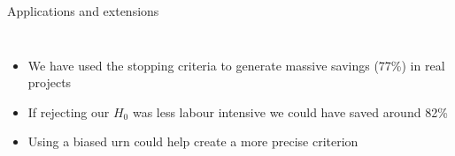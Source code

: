 \documentclass[9pt,aspectratio=169]{beamer}
\begin{document}
\begin{frame}{Applications and extensions}
\begin{columns}

\small

\begin{itemize}
	\item<1-> We have used the stopping criteria to generate massive savings (77\%) in real projects
	\item<2-> If rejecting our $H_0$ was less labour intensive we could have saved around 82\%
	\item<3-> Using a biased urn could help create a more precise criterion
\end{itemize}

\end{columns}

\end{frame}			

\end{document}
